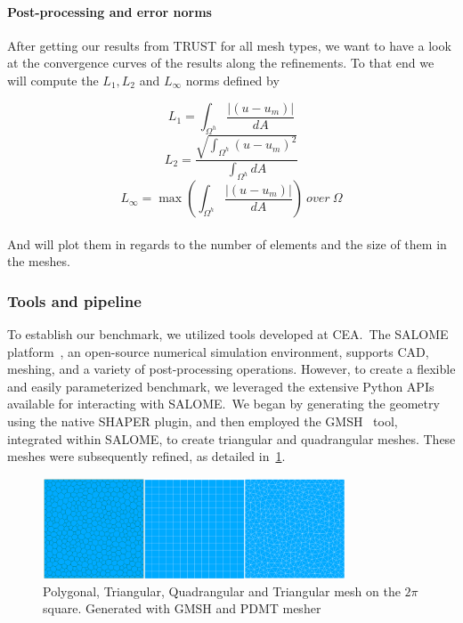 \documentclass{article}
\begin{document}
\paragraph{Post-processing and error norms}

After getting our results from TRUST for all mesh types, we want to have a look at the convergence curves of the results along the refinements. To that end we will compute the $L_1, L_2$ and $L_\infty$ norms defined by

\[
L_1 = \int_{\Omega^h} \frac{|(u - u_m)|}{dA}
\]
\[
L_2 = \frac{\sqrt{\int_{\Omega^h}{(u - u_m)}^2}}{\int_{\Omega^h}dA}
\]
\[
L_{\infty} = \max{(\int_{\Omega^h} \frac{|(u - u_m)|}{dA})}~over~\Omega
\]\\
And will plot them in regards to the number of elements and the size of them in the meshes.

\subsubsection{Tools and pipeline}

To establish our benchmark, we utilized tools developed at CEA.~The SALOME platform~\cite{CEA_SALOME}, an open-source numerical simulation environment, supports CAD, meshing, and a variety of post-processing operations. However, to create a flexible and easily parameterized benchmark, we leveraged the extensive Python APIs available for interacting with SALOME.~We began by generating the geometry using the native SHAPER plugin, and then employed the GMSH~\cite{Geuzaine2009Gmsh} tool, integrated within SALOME, to create triangular and quadrangular meshes. These meshes were subsequently refined, as detailed in~\cref{refinements}.

\begin{figure}[htbp]
	\centering
	\includegraphics[width=0.8\textwidth]{./Images/refinements.png}
	\caption{\label{refinements} Polygonal, Triangular, Quadrangular and Triangular mesh on the $2\pi$ square. Generated with GMSH and PDMT mesher}
\end{figure}
\end{document}

